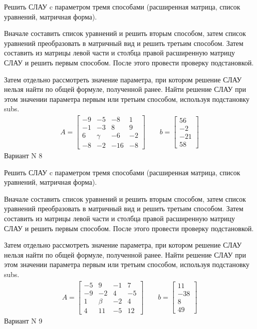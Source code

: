 \documentclass[11pt]{report}
\begin{document}
Решить СЛАУ c параметром тремя способами (расширенная матрица, список уравнений, матричная форма).

Вначале составить список уравнений и решить вторым способом,
затем список уравнений преобразовать в матричный вид и решить третьим способом.
Затем составить из матрицы левой части и столбца правой расширенную матрицу СЛАУ и решить первым способом.
После этого провести проверку подстановкой.

Затем отдельно рассмотреть значение параметра, при котором решение СЛАУ нельзя найти по общей формуле,
полученной ранее.
Найти решение СЛАУ при этом значении параметра первым или третьим способом, используя подстановку subs.
\begin{align*}
    A = \left[\begin{matrix}-9 & -5 & -8 & 1\\-1 & -3 & 8 & 9\\6 & \gamma & -6 & -2\\-8 & -2 & -16 & -8\end{matrix}\right]
\qquad b = \left[\begin{matrix}56\\-2\\-21\\58\end{matrix}\right]
\end{align*}
\newpage
Вариант N 8


Решить СЛАУ c параметром тремя способами (расширенная матрица, список уравнений, матричная форма).

Вначале составить список уравнений и решить вторым способом,
затем список уравнений преобразовать в матричный вид и решить третьим способом.
Затем составить из матрицы левой части и столбца правой расширенную матрицу СЛАУ и решить первым способом.
После этого провести проверку подстановкой.

Затем отдельно рассмотреть значение параметра, при котором решение СЛАУ нельзя найти по общей формуле,
полученной ранее.
Найти решение СЛАУ при этом значении параметра первым или третьим способом, используя подстановку subs.
\begin{align*}
    A = \left[\begin{matrix}-5 & 9 & -1 & 7\\-9 & -2 & 4 & -5\\1 & \beta & -2 & 4\\4 & 11 & -5 & 12\end{matrix}\right]
\qquad b = \left[\begin{matrix}11\\-38\\8\\49\end{matrix}\right]
\end{align*}
\newpage
Вариант N 9
\end{document}
